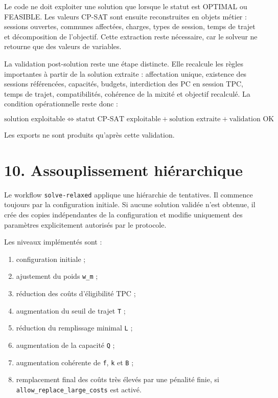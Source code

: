 \documentclass[11pt,a4paper]{article}
\begin{document}
Le code ne doit exploiter une solution que lorsque le statut est OPTIMAL ou FEASIBLE. Les valeurs CP-SAT sont ensuite reconstruites en objets métier : sessions ouvertes, communes affectées, charges, types de session, temps de trajet et décomposition de l'objectif. Cette extraction reste nécessaire, car le solveur ne retourne que des valeurs de variables.

La validation post-solution reste une étape distincte. Elle recalcule les règles importantes à partir de la solution extraite : affectation unique, existence des sessions référencées, capacités, budgets, interdiction des PC en session TPC, temps de trajet, compatibilités, cohérence de la mixité et objectif recalculé. La condition opérationnelle reste donc :

\[
\text{solution exploitable}
\Longleftrightarrow
\text{statut CP-SAT exploitable}
+
\text{solution extraite}
+
\text{validation OK}
\]

Les exports ne sont produits qu'après cette validation.

\section{10. Assouplissement hiérarchique}

Le workflow \texttt{solve-relaxed} applique une hiérarchie de tentatives. Il commence toujours par la configuration initiale. Si aucune solution validée n'est obtenue, il crée des copies indépendantes de la configuration et modifie uniquement des paramètres explicitement autorisés par le protocole.

Les niveaux implémentés sont :

\begin{enumerate}
\item configuration initiale ;
\item ajustement du poids \texttt{w\_m} ;
\item réduction des coûts d'éligibilité TPC ;
\item augmentation du seuil de trajet \texttt{T} ;
\item réduction du remplissage minimal \texttt{L} ;
\item augmentation de la capacité \texttt{Q} ;
\item augmentation cohérente de \texttt{f}, \texttt{k} et \texttt{B} ;
\item remplacement final des coûts très élevés par une pénalité finie, si
  \texttt{allow\_replace\_large\_costs} est activé.

\end{enumerate}
\end{document}
